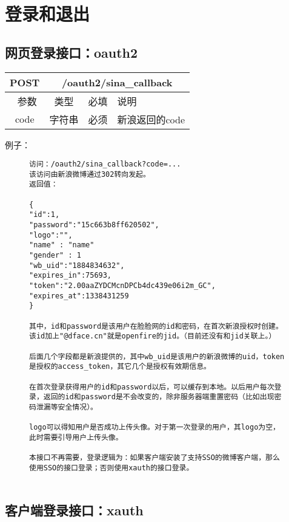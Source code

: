 
\section{登录和退出}
\subsection{网页登录接口：oauth2}


\begin{table}[H]
   \begin{center}
\begin{tabular}{|c|c|c|p{12cm}|}
\hline
POST & \multicolumn{3}{|c|}{/oauth2/sina\_callback} \\
\hline\hline
 \  参数  & 类型 & 必填 &  说明  \\
\hline
 code  & 字符串 & 必须 &  新浪返回的code\\
\hline
\end{tabular}
   \end{center}
\end{table}


例子：

\begin{figure}[H]
\begin{verbatim}
访问：/oauth2/sina_callback?code=...
该访问由新浪微博通过302转向发起。
返回值：

{
"id":1,
"password":"15c663b8ff620502",
"logo":"",
"name" : "name"
"gender" : 1
"wb_uid":"1884834632",
"expires_in":75693,
"token":"2.00aaZYDCMcnDPCb4dc439e06i2m_GC",
"expires_at":1338431259
}

其中，id和password是该用户在脸脸网的id和密码，在首次新浪授权时创建。该id加上"@dface.cn"就是openfire的jid。（目前还没有和jid关联上。）

后面几个字段都是新浪提供的，其中wb_uid是该用户的新浪微博的uid，token是授权的access_token，其它几个是授权有效期信息。

在首次登录获得用户的id和password以后，可以缓存到本地。以后用户每次登录，返回的id和password是不会改变的，除非服务器端重置密码（比如出现密码泄漏等安全情况）。

logo可以得知用户是否成功上传头像。对于第一次登录的用户，其logo为空，此时需要引导用户上传头像。

本接口不再需要，登录逻辑为：如果客户端安装了支持SSO的微博客户端，那么使用SSO的接口登录；否则使用xauth的接口登录。


\end{verbatim}
\end{figure}

\subsection{客户端登录接口：xauth}
\label{hash_algorithm}

